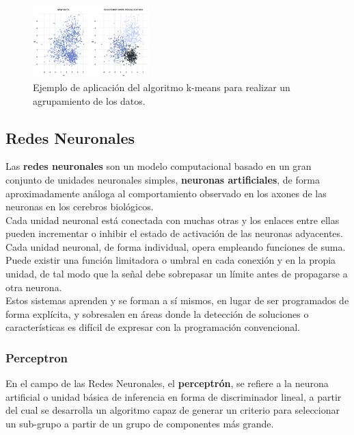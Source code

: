 \documentclass[osajnl,twocolumn,showpacs,superscriptaddress,10pt,floatfix]{revtex4-1} %
\begin{document}
\begin{figure}[H]
    \centering
    \includegraphics[width=0.4\textwidth]{theory/clustering}
    \caption{Ejemplo de aplicación del algoritmo k-means para realizar un agrupamiento de los datos.}
    \label{figure:clustering_example}
\end{figure}

\subsection{Redes Neuronales}

Las \textbf{redes neuronales} son un modelo computacional basado en un gran conjunto de unidades neuronales simples, \textbf{neuronas artificiales}, de forma aproximadamente análoga al comportamiento observado en los axones de las neuronas en los cerebros biológicos. \\

Cada unidad neuronal está conectada con muchas otras y los enlaces entre ellas pueden incrementar o inhibir el estado de activación de las neuronas adyacentes. Cada unidad neuronal, de forma individual, opera empleando funciones de suma. Puede existir una función limitadora o umbral en cada conexión y en la propia unidad, de tal modo que la señal debe sobrepasar un límite antes de propagarse a otra neurona. \\

Estos sistemas aprenden y se forman a sí mismos, en lugar de ser programados de forma explícita, y sobresalen en áreas donde la detección de soluciones o características es difícil de expresar con la programación convencional.

\subsubsection{Perceptron}

En el campo de las Redes Neuronales, el \textbf{perceptrón}, se refiere a la neurona artificial o unidad básica de inferencia en forma de discriminador lineal, a partir del cual se desarrolla un algoritmo capaz de generar un criterio para seleccionar un sub-grupo a partir de un grupo de componentes más grande. \\
\end{document}
